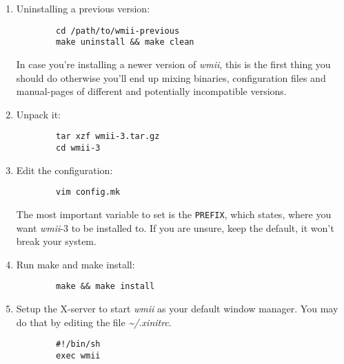 \documentclass[12pt,a4paper]{article} %
\newcommand{\wmii}{\emph{wmii}}
\begin{document}
    \begin{enumerate}
      
    \item Uninstalling a previous version:
      \begin{verbatim}
        cd /path/to/wmii-previous
        make uninstall && make clean 
      \end{verbatim}

      In case you're installing a newer version of \wmii, this is the
      first thing you should do otherwise you'll end up mixing
      binaries, configuration files and manual-pages of different and
      potentially incompatible versions.

    \item Unpack it:
      \begin{verbatim}
        tar xzf wmii-3.tar.gz
        cd wmii-3
      \end{verbatim}
      
    \item Edit the configuration:
      \begin{verbatim}
        vim config.mk
      \end{verbatim}
      
      The most important variable to set is the \verb+PREFIX+, which
      states, where you want \wmii-3 to be installed to. If you are unsure, keep the
      default, it won't break your system.
      
    \item Run make and make install:
      \begin{verbatim}
        make && make install
      \end{verbatim}
      
    \item Setup the X-server to start \wmii{} as your default window
      manager. You may do that by editing the file \emph{\~{}/.xinitrc}.

      \begin{verbatim}
        #!/bin/sh
        exec wmii
      \end{verbatim}


    \end{enumerate}
    
\end{document}
